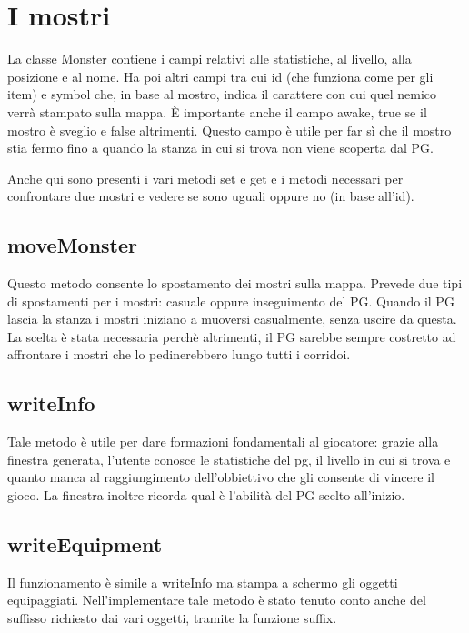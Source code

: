 \documentclass[10pt]{report}
\begin{document}
\section{I mostri}

La classe Monster contiene i campi relativi alle statistiche, al livello, alla posizione e al nome.
Ha poi altri campi tra cui id (che funziona come per gli item) e symbol che, in base al mostro, indica
il carattere con cui quel nemico verrà stampato sulla mappa.
È importante anche il campo awake, true se il mostro è sveglio e false altrimenti. Questo campo è utile
per far sì che il mostro stia fermo fino a quando la stanza in cui si trova non viene scoperta dal PG.

Anche qui sono presenti i vari metodi set e get e i metodi necessari per confrontare due mostri e vedere
se sono uguali oppure no (in base all'id).

\subsection{moveMonster}
Questo metodo consente lo spostamento dei mostri sulla mappa. Prevede due tipi di spostamenti per i
mostri: casuale oppure inseguimento del PG. Quando il PG lascia la stanza i mostri iniziano a muoversi
casualmente, senza uscire da questa. La scelta è stata necessaria perchè altrimenti, il PG sarebbe
sempre costretto ad affrontare i mostri che lo pedinerebbero lungo tutti i corridoi.	

\subsection{writeInfo}

Tale metodo è utile per dare formazioni fondamentali al giocatore: grazie alla finestra generata,
l'utente conosce le statistiche del pg, il livello in cui si trova e quanto manca al raggiungimento
dell'obbiettivo che gli consente di vincere il gioco. La finestra inoltre ricorda qual è l'abilità del
PG scelto all'inizio.

\subsection{writeEquipment}

Il funzionamento è simile a writeInfo ma stampa a schermo gli oggetti equipaggiati. Nell'implementare
tale metodo è stato tenuto conto anche del suffisso richiesto dai vari oggetti, tramite la funzione 
suffix.
\end{document}
